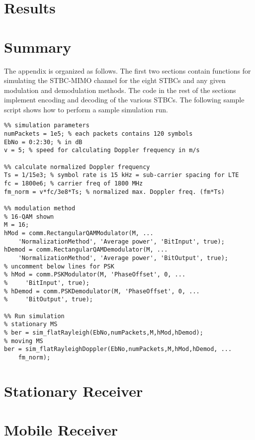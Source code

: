 \documentclass[12pt,onecolumn]{IEEEtran}
\begin{document}
\section{Results}


\section{Summary}




\appendix

The appendix is organized as follows. The first two sections contain functions for simulating the STBC-MIMO channel for the eight STBCs and any given modulation and demodulation methods. The code in the rest of the sections implement encoding and decoding of the various STBCs. The following sample script shows how to perform a sample simulation run.

\begin{lstlisting}
%% simulation parameters
numPackets = 1e5; % each packets contains 120 symbols
EbNo = 0:2:30; % in dB
v = 5; % speed for calculating Doppler frequency in m/s

%% calculate normalized Doppler frequency
Ts = 1/15e3; % symbol rate is 15 kHz = sub-carrier spacing for LTE
fc = 1800e6; % carrier freq of 1800 MHz
fm_norm = v*fc/3e8*Ts; % normalized max. Doppler freq. (fm*Ts)

%% modulation method
% 16-QAM shown
M = 16;
hMod = comm.RectangularQAMModulator(M, ...
    'NormalizationMethod', 'Average power', 'BitInput', true);
hDemod = comm.RectangularQAMDemodulator(M, ...
    'NormalizationMethod', 'Average power', 'BitOutput', true);
% uncomment below lines for PSK
% hMod = comm.PSKModulator(M, 'PhaseOffset', 0, ...
%     'BitInput', true);
% hDemod = comm.PSKDemodulator(M, 'PhaseOffset', 0, ...
%     'BitOutput', true);

%% Run simulation
% stationary MS
% ber = sim_flatRayleigh(EbNo,numPackets,M,hMod,hDemod);
% moving MS
ber = sim_flatRayleighDoppler(EbNo,numPackets,M,hMod,hDemod, ...
    fm_norm);
\end{lstlisting}

\appendices

\section{Stationary Receiver}

\section{Mobile Receiver}

\end{document}
